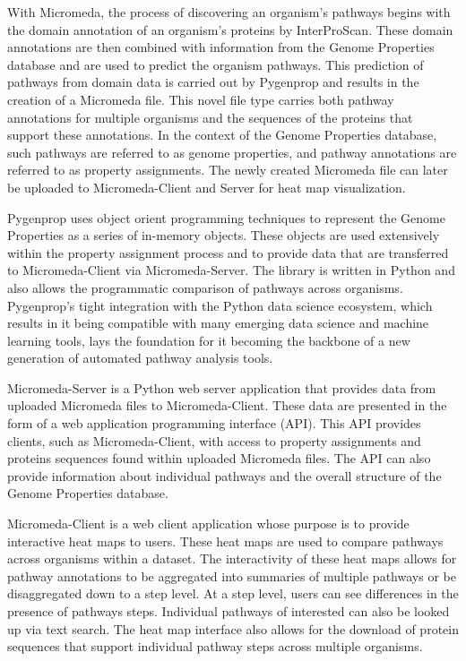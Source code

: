 With Micromeda, the process of discovering an organism's pathways begins with 
the domain annotation of an organism's proteins by InterProScan. These domain 
annotations are then combined with information from the Genome Properties 
database and are used to predict the organism pathways. This prediction of 
pathways from domain data is carried out by Pygenprop and results in the 
creation of a Micromeda file. This novel file type carries both pathway 
annotations for multiple organisms and the sequences of the proteins that 
support these annotations. In the context of the Genome Properties database, 
such pathways are referred to as genome properties, and pathway annotations are 
referred to as property assignments. The newly created Micromeda file can later 
be uploaded to Micromeda-Client and Server for heat map visualization.

Pygenprop uses object orient programming techniques to represent the Genome 
Properties as a series of in-memory objects. These objects are used extensively 
within the property assignment process and to provide data that are transferred 
to Micromeda-Client via Micromeda-Server. The library is written in Python and 
also allows the programmatic comparison of pathways across organisms. 
Pygenprop's tight integration with the Python data science ecosystem, which 
results in it being compatible with many emerging data science and machine 
learning tools, lays the foundation for it becoming the backbone of a new 
generation of automated pathway analysis tools.

Micromeda-Server is a Python web server application that provides data from 
uploaded Micromeda files to Micromeda-Client. These data are presented in the form 
of a web application programming interface (API). This API provides clients, 
such as Micromeda-Client, with access to property assignments and proteins 
sequences found within uploaded Micromeda files. The API can also provide 
information about individual pathways and the overall structure of the Genome 
Properties database.

Micromeda-Client is a web client application whose purpose is to provide 
interactive heat maps to users. These heat maps are used to compare pathways 
across organisms within a dataset. The interactivity of these heat maps allows 
for pathway annotations to be aggregated into summaries of multiple pathways or 
be disaggregated down to a step level. At a step level, users can see 
differences in the presence of pathways steps. Individual pathways of interested 
can also be looked up via text search. The heat map interface also allows for 
the download of protein sequences that support individual pathway steps across 
multiple organisms.


